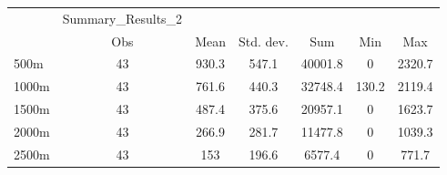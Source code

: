 \begin{tabular}{l*{6}{c}}
\hline\hline
            &Summary\_Results\_2&            &            &            &            &            \\
            &         Obs&        Mean&   Std. dev.&         Sum&         Min&         Max\\
\hline
500m        &          43&       930.3&       547.1&     40001.8&           0&      2320.7\\
1000m       &          43&       761.6&       440.3&     32748.4&       130.2&      2119.4\\
1500m       &          43&       487.4&       375.6&     20957.1&           0&      1623.7\\
2000m       &          43&       266.9&       281.7&     11477.8&           0&      1039.3\\
2500m       &          43&         153&       196.6&      6577.4&           0&       771.7\\
\hline\hline
\end{tabular}
